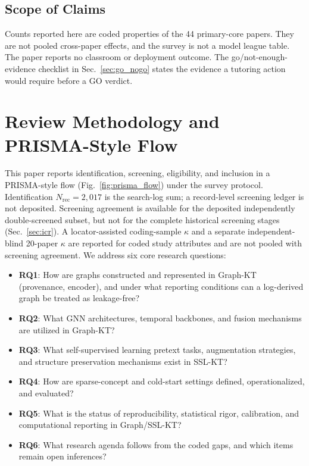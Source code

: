 \documentclass[lettersize,journal]{IEEEtran}
\begin{document}
\subsection{Scope of Claims}
\label{sec:scope_claims}
Counts reported here are coded properties of the 44 primary-core papers. They are not pooled cross-paper effects, and the survey is not a model league table. The paper reports no classroom or deployment outcome. The go/not-enough-evidence checklist in Sec.~\ref{sec:go_nogo} states the evidence a tutoring action would require before a GO verdict.

\section{Review Methodology and PRISMA-Style Flow}
\label{sec:methodology}
This paper reports identification, screening, eligibility, and inclusion in a PRISMA-style flow (Fig.~\ref{fig:prisma_flow}) under the survey protocol. Identification $N_{\mathrm{rec}}=2{,}017$ is the search-log sum; a record-level screening ledger is not deposited. Screening agreement is available for the deposited independently double-screened subset, but not for the complete historical screening stages (Sec.~\ref{sec:icr}). A locator-assisted coding-sample $\kappa$ and a separate independent-blind 20-paper $\kappa$ are reported for coded study attributes and are not pooled with screening agreement.
We address six core research questions:
\begin{itemize}
    \item \textbf{RQ1}: How are graphs constructed and represented in Graph-KT (provenance, encoder), and under what reporting conditions can a log-derived graph be treated as leakage-free?
    \item \textbf{RQ2}: What GNN architectures, temporal backbones, and fusion mechanisms are utilized in Graph-KT?
    \item \textbf{RQ3}: What self-supervised learning pretext tasks, augmentation strategies, and structure preservation mechanisms exist in SSL-KT?
    \item \textbf{RQ4}: How are sparse-concept and cold-start settings defined, operationalized, and evaluated?
    \item \textbf{RQ5}: What is the status of reproducibility, statistical rigor, calibration, and computational reporting in Graph/SSL-KT?
    \item \textbf{RQ6}: What research agenda follows from the coded gaps, and which items remain open inferences?
\end{itemize}
\end{document}
